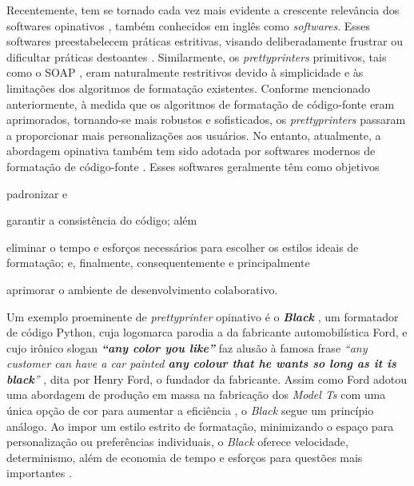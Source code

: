 \documentclass
  [11pt, a4paper, english, openright, sumario = tradicional, twoside, brazil]
  {abntex2}
\begin{document}
  Recentemente, tem se tornado cada vez mais evidente a crescente relevância
  dos softwares opinativos \cite{eccles-2015-rise}, também conhecidos em inglês
  como \textit{ softwares}. Esses softwares preestabelecem
  práticas estritivas, visando deliberadamente frustrar ou dificultar práticas
  destoantes \cite{lance-2021-about}. Similarmente, os \textit{prettyprinters}
  primitivos, tais como o SOAP \cite{scowen-1971-soap}, eram naturalmente
  restritivos devido à simplicidade e às limitações dos algoritmos de
  formatação existentes. Conforme mencionado anteriormente, à medida que os
  algoritmos de formatação de código-fonte eram aprimorados, tornando-se mais
  robustos e sofisticados, os \textit{prettyprinters} passaram a proporcionar
  mais personalizações aos usuários. No entanto, atualmente, a abordagem
  opinativa também tem sido adotada por softwares modernos de formatação de
  código-fonte \cites{black-2023-black}[5--6,8]{griesemer-2022-cultural}. Esses
  softwares geralmente têm como objetivos
  \begin{inparaenum}
    \item padronizar e
    \item garantir a consistência do código; além
    \item eliminar o tempo e esforços necessários para escolher os estilos
          ideais de formatação; e, finalmente, consequentemente e
          principalmente
    \item aprimorar o ambiente de desenvolvimento colaborativo.
  \end{inparaenum}

  Um exemplo proeminente de \textit{prettyprinter} opinativo é o
  \textit{\textbf{Black}} \cite{black-2023-black}, um formatador de código
  Python, cuja logomarca parodia a da fabricante automobilística Ford, e cujo
  irônico slogan \textit{\textbf{``any color you like''}} faz alusão à famosa
  frase
  \textit
    {``any customer can have a car painted \textbf{any colour that he wants so
     long as it is black}''}
  \cite[p. 72, grifo nosso]{ford-1922-my}, dita por Henry Ford, o fundador da
  fabricante. Assim como Ford adotou uma abordagem de produção em massa na
  fabricação dos \textit{Model Ts} com uma única opção de cor para aumentar a
  eficiência \cite{ford-1922-my}, o \textit{Black} segue um princípio análogo.
  Ao impor um estilo estrito de formatação, minimizando o espaço para
  personalização ou preferências individuais, o \textit{Black} oferece
  velocidade, determinismo, além de economia de tempo e esforços para questões
  mais importantes \cite{black-2023-black}.
\end{document}
